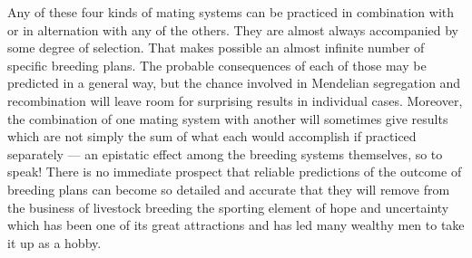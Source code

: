 Any of these four kinds of mating systems can be practiced in combination
with or in alternation with any of the others. They are almost
always accompanied by some degree of selection. That makes possible
an almost infinite number of specific breeding plans. The probable consequences
of each of those may be predicted in a general way, but the
chance involved in Mendelian segregation and recombination will
leave room for surprising results in individual cases. Moreover, the
combination of one mating system with another will sometimes give
results which are not simply the sum of what each would accomplish if
practiced separately --- an epistatic effect among the breeding systems
themselves, so to speak! There is no immediate prospect that reliable
predictions of the outcome of breeding plans can become so detailed
and accurate that they will remove from the business of livestock
breeding the sporting element of hope and uncertainty which has
been one of its great attractions and has led many wealthy men to take
it up as a hobby.

